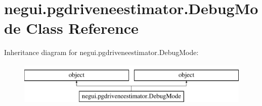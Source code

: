 \hypertarget{classnegui_1_1pgdriveneestimator_1_1DebugMode}{}\section{negui.\+pgdriveneestimator.\+Debug\+Mode Class Reference}
\label{classnegui_1_1pgdriveneestimator_1_1DebugMode}
Inheritance diagram for negui.\+pgdriveneestimator.\+Debug\+Mode\+:\begin{figure}[H]
\begin{center}
\leavevmode
\includegraphics[height=2.000000cm]{classnegui_1_1pgdriveneestimator_1_1DebugMode}
\end{center}
\end{figure}
